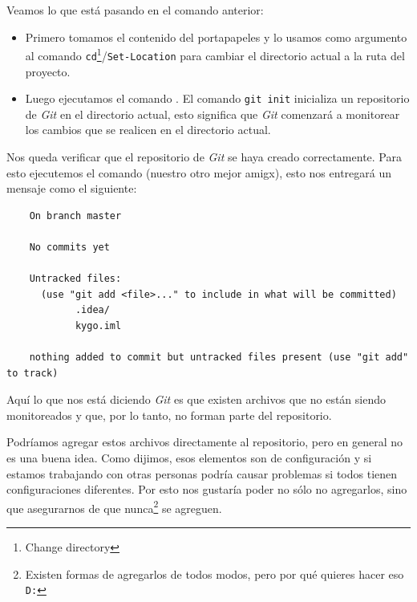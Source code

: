   \begin{defaultbox}[MacOS]
  \end{defaultbox}

  Veamos lo que está pasando en el comando anterior:
  \begin{itemize}
    \item Primero tomamos el contenido del portapapeles y lo usamos como argumento al comando 
      \texttt{cd}\footnote{Change directory}/\texttt{Set-Location} para cambiar el directorio actual a la ruta del proyecto.
    \item Luego ejecutamos el comando .
      El comando \texttt{git init} inicializa un repositorio de \textit{Git} en el directorio
      actual, esto significa que \textit{Git} comenzará a monitorear los cambios que se realicen
      en el directorio actual.
  \end{itemize}

  Nos queda verificar que el repositorio de \textit{Git} se haya creado correctamente.
  Para esto ejecutemos el comando  (nuestro otro mejor amigx), esto nos entregará
  un mensaje como el siguiente:

  \begin{verbatim}
    On branch master

    No commits yet

    Untracked files:
      (use "git add <file>..." to include in what will be committed)
            .idea/
            kygo.iml

    nothing added to commit but untracked files present (use "git add" to track)
  \end{verbatim}

  Aquí lo que nos está diciendo \textit{Git} es que existen archivos que no están siendo 
  monitoreados y que, por lo tanto, no forman parte del repositorio.

  Podríamos agregar estos archivos directamente al repositorio, pero en general no es una buena 
  idea.
  Como dijimos, esos elementos son de configuración y si estamos trabajando con otras personas
  podría causar problemas si todos tienen configuraciones diferentes.
  Por esto nos gustaría poder no sólo no agregarlos, sino que asegurarnos de que nunca\footnote{
    Existen formas de agregarlos de todos modos, pero por qué quieres hacer eso \texttt{D:}
  } 
  se agreguen.

